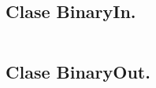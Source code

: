 \documentclass{article}
\begin{document}
 
\subsection*{Clase BinaryIn.} 
\inputminted[mathescape,
               numbersep=5pt,
               frame=lines,
               framesep=2mm]{java}{practica3/BinaryIn.java}
               
\subsection*{Clase BinaryOut.} 
\inputminted[mathescape,
               numbersep=5pt,
               frame=lines,
               framesep=2mm]{java}{practica3/BinaryOut.java}
               
\end{document}
